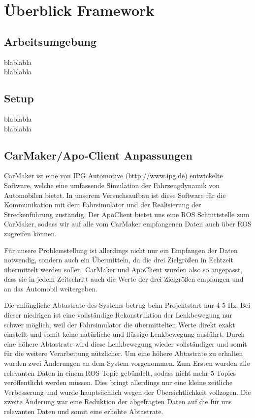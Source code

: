 
\chapter{Überblick Framework} %
\label{cha:Ueberblick_Framework}


\section{Arbeitsumgebung} %
\label{sub:Arbeitsumgebung}
blablabla\\

blablabla


\section{Setup} %
\label{sub:Setup}
blablabla\\

blablabla


\section{CarMaker/Apo-Client Anpassungen} %
\label{sub:Carmaker_Apo_Client_Anpassungen}
CarMaker ist eine von IPG Automotive (http://www.ipg.de) entwickelte Software, welche eine umfassende Simulation der Fahrzeugdynamik von Automobilen bietet. In unserem Versuchsaufbau ist diese Software für die Kommunikation mit dem Fahrsimulator und der Realisierung der Streckenführung zuständig.
Der ApoClient bietet uns eine ROS Schnittstelle zum CarMaker, sodass wir auf alle vom CarMaker empfangenen Daten auch über ROS zugreifen können.

Für unsere Problemstellung ist allerdings nicht nur ein Empfangen der Daten notwendig, sondern auch ein Übermitteln, da die drei Zielgrößen in Echtzeit übermittelt werden sollen. CarMaker und ApoClient wurden also so angepasst, dass sie in jedem Zeitschritt auch die Werte der drei Zielgrößen empfangen und an das Automobil weitergeben.

Die anfängliche Abtastrate des Systems betrug beim Projektstart nur 4-5 Hz. Bei dieser niedrigen ist eine vollständige Rekonstruktion der Lenkbewegung nur schwer möglich, weil der Fahrsimulator die übermittelten Werte direkt exakt einstellt und somit keine natürliche und flüssige Lenkbewegung ausführt. Durch eine höhere Abtastrate wird diese Lenkbewegung wieder vollständiger und somit für die weitere Verarbeitung nützlicher.
Um eine höhere Abtastrate zu erhalten wurden zwei Änderungen an dem System vorgenommen. Zum Ersten wurden alle relevanten Daten in einem ROS-Topic gebündelt, sodass nicht mehr 5 Topics veröffentlicht werden müssen. Dies bringt allerdings nur eine kleine zeitliche Verbesserung und wurde hauptsächlich wegen der Übersichtlichkeit vollzogen. Die zweite Änderung war eine Reduktion der abgefragten Daten auf die für uns relevanten Daten und somit eine erhöhte Abtastrate.

